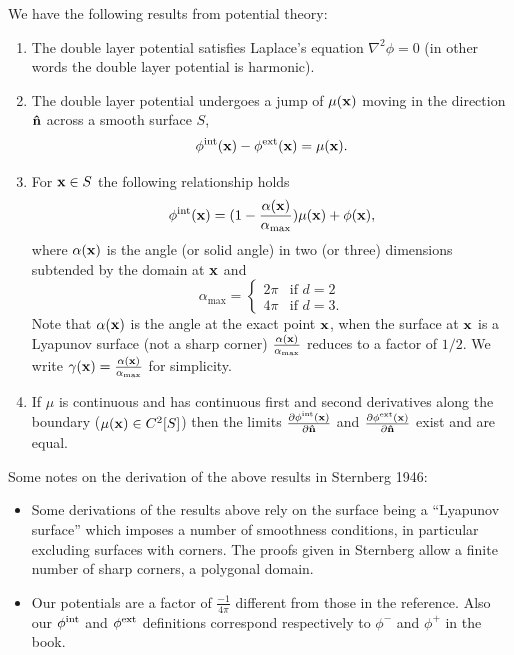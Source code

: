 We have the following results from potential theory:\cite{Sternberg1946}
\begin{enumerate}
\item The double layer potential satisfies Laplace's equation $\nabla^2 \phi = 0$ (in other words the double layer potential is harmonic).%

\item The double layer potential undergoes a jump of $\mu(\mathbf{x})$ moving in the direction $\mathbf{\hat{n}}$ across a smooth surface $S$, \ie
  \begin{equation}
    \label{eq:15}
    \phi^{\text{int}}(\mathbf{x}) - \phi^{\text{ext}}(\mathbf{x}) = \mu(\mathbf{x}).
  \end{equation}

\item For $\mathbf{x} \in S$ the following relationship holds
  \begin{equation}
    \phi^{\text{int}}(\mathbf{x}) = (1 - \frac{\alpha(\mathbf{x})}{\alpha_{\text{max}}}) \mu(\mathbf{x}) + \phi(\mathbf{x}),
    \label{eq:22}
  \end{equation}
  where $\alpha(\mathbf{x})$ is the angle (or solid angle) in two (or three) dimensions subtended by the domain at $\mathbf{x}$ and
\begin{equation*}
  \alpha_{\text{max}} =
  \begin{cases}
    2 \pi & \text{if } d=2 \\
    4 \pi & \text{if } d=3.
  \end{cases}\label{eq:16}
\end{equation*}
Note that $\alpha(\mathbf{x})$ is the angle at the exact point $\mathbf{x}$, when the surface at $\mathbf{x}$ is a Lyapunov surface (\ie not a sharp corner) $\frac{\alpha(\mathbf{x})}{\alpha_{\text{max}}}$ reduces to a factor of $1/2$. We write $\gamma(\mathbf{x}) = \frac{\alpha(\mathbf{x})}{\alpha_{\text{max}}}$ for simplicity.

\item If $\mu$ is continuous and has continuous first and second derivatives along the boundary (\ie $\mu(\mathbf{x}) \in C^2[S]$) then the limits $\frac{\partial \phi^{\text{int}}(\mathbf{x})}{\partial \mathbf{\hat{n}}}$ and $\frac{\partial \phi^{\text{ext}}(\mathbf{x})}{\partial \mathbf{\hat{n}}}$ exist and are equal. %

\end{enumerate}

Some notes on the derivation of the above results in Sternberg 1946\cite{Sternberg1946}:
\begin{itemize}
\item Some derivations of the results above rely on the surface being a ``Lyapunov surface'' which imposes a number of smoothness conditions, in particular excluding surfaces with corners.
The proofs given in Sternberg allow a finite number of sharp corners, \ie a polygonal domain.
\item Our potentials are a factor of $\frac{-1}{4 \pi}$ different from those in the reference. Also our $\phi^{\text{int}}$ and $\phi^{\text{ext}}$ definitions correspond respectively to $\phi^-$ and $\phi^+$ in the book.
\end{itemize}


